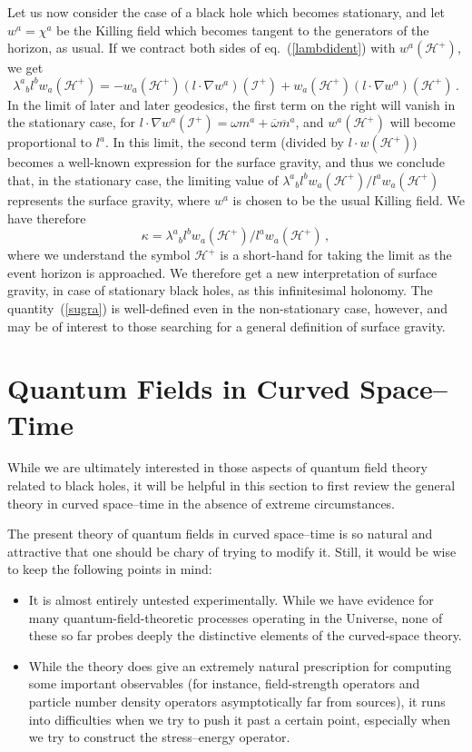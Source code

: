 \documentclass[12pt]{article}
\newcommand{\scrif}{{{\mathscr I}^{+}}}
\newcommand{\Hf}{{{\mathscr H}^{+}}} %
\begin{document}
Let us now consider the case of a black hole which becomes stationary, and let $w^a=\chi ^a$ be the
Killing field which becomes tangent to the generators of the horizon, as usual.  If we contract both sides of eq.~(\ref{lambdident}) with $w^a(\Hf )$, we get
\begin{equation}\label{sugra}
 \lambda ^a{}_bl^bw_a(\Hf )=-w_a(\Hf )(l\cdot \nabla w^a )(\scrif ) 
  +w_a(\Hf )(l\cdot \nabla w^a)(\Hf )\, .
\end{equation}
In the limit of later and later geodesics, the first term on the right will vanish in the stationary case, for $l\cdot\nabla w^a (\scrif ) =\omega m^a+\overline\omega {\overline m}^a$, and $w^a(\Hf )$ will become proportional to $l^a$.  In this limit, the second term (divided by $l\cdot w(\Hf )$) becomes a well-known expression for the surface gravity, and thus we conclude that, in the stationary case, the limiting value of $ \lambda ^a{}_bl^bw_a(\Hf ) /l^aw_a(\Hf )$ represents the surface gravity, where $w^a$ is chosen to be the usual Killing field.  We have therefore
\begin{equation}
\kappa =\lambda ^a{}_bl^bw_a(\Hf )/l^aw_a(\Hf )\, ,
\end{equation}
where we understand the symbol $\Hf$ is a short-hand for taking the limit as the event horizon is approached.
We therefore get a new interpretation of surface gravity, in case of stationary black holes, as this infinitesimal holonomy.  The quantity~(\ref{sugra}) is well-defined even in the non-stationary case, however, and may be of interest to those searching for a general definition of surface gravity.


\section{Quantum Fields in Curved Space--Time}

While we are ultimately interested in those aspects of quantum field theory  related to black holes, it will be helpful in this section to first review the general theory in curved space--time in the absence of extreme circumstances. 

The present theory of quantum fields in curved space--time is so natural and attractive that one should be chary of trying to modify it.  Still, it would be wise to keep the following points in mind:

\begin{itemize}

\item
It is almost entirely untested experimentally.  While we have evidence for many
quantum-field-theoretic processes operating in the Universe, none of these so far probes deeply the distinctive elements of the curved-space theory.

\item
While the theory does give an extremely natural prescription for computing some important observables (for instance, field-strength operators and particle number density operators asymptotically far from sources), it
runs into difficulties when we try to push it past a certain point, especially when we try to construct the stress--energy operator.  
\end{itemize}
\end{document}
